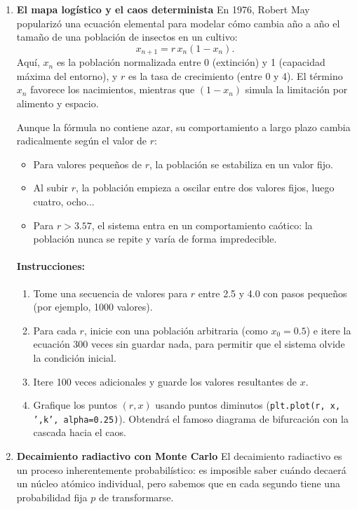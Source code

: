 \documentclass[12pt]{article}
\begin{document}
\begin{problemas}[]
\begin{enumerate}[leftmargin=*]
\item \textbf{El mapa logístico y el caos determinista} En 1976, Robert May popularizó una ecuación elemental para modelar cómo cambia año a año el tamaño de una población de insectos en un cultivo:
\begin{equation}
    x_{n+1} = r \, x_n (1 - x_n).
\end{equation}
Aquí, $x_n$ es la población normalizada entre 0 (extinción) y 1 (capacidad máxima del entorno), y $r$ es la tasa de crecimiento (entre 0 y 4). El término $x_n$ favorece los nacimientos, mientras que $(1 - x_n)$ simula la limitación por alimento y espacio.

Aunque la fórmula no contiene azar, su comportamiento a largo plazo cambia radicalmente según el valor de $r$:
\begin{itemize}
    \item Para valores pequeños de $r$, la población se estabiliza en un valor fijo.
    \item Al subir $r$, la población empieza a oscilar entre dos valores fijos, luego cuatro, ocho...
    \item Para $r > 3.57$, el sistema entra en un comportamiento caótico: la población nunca se repite y varía de forma impredecible.
\end{itemize}

\paragraph{Instrucciones:}
\begin{enumerate}
    \item Tome una secuencia de valores para $r$ entre 2.5 y 4.0 con pasos pequeños (por ejemplo, 1000 valores).
    \item Para cada $r$, inicie con una población arbitraria (como $x_0 = 0.5$) e itere la ecuación 300 veces sin guardar nada, para permitir que el sistema olvide la condición inicial.
    \item Itere 100 veces adicionales y guarde los valores resultantes de $x$.
    \item Grafique los puntos $(r, x)$ usando puntos diminutos (\texttt{plt.plot(r, x, ',k', alpha=0.25)}). Obtendrá el famoso diagrama de bifurcación con la cascada hacia el caos.
\end{enumerate}

\item \textbf{Decaimiento radiactivo con Monte Carlo} El decaimiento radiactivo es un proceso inherentemente probabilístico: es imposible saber cuándo decaerá un núcleo atómico individual, pero sabemos que en cada segundo tiene una probabilidad fija $p$ de transformarse.


\end{enumerate}
\end{problemas}
\end{document}
